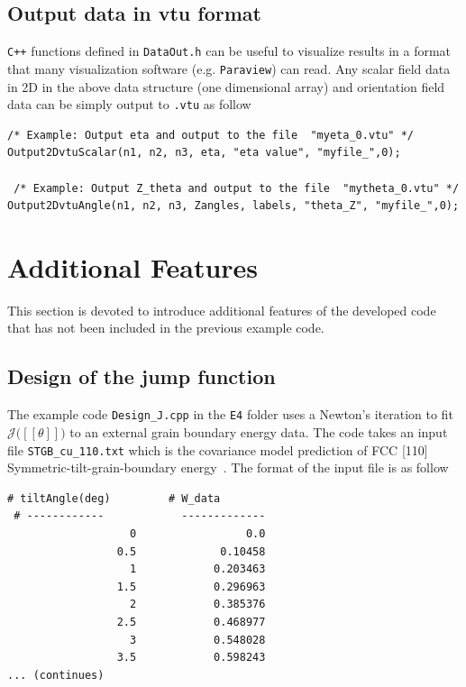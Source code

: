 \documentclass[11pt]{article}
\begin{document}
\subsection{Output data in vtu format}

\texttt{C++} functions defined in \texttt{DataOut.h} can be useful 
to visualize results in a format that many visualization software (e.g. \texttt{Paraview}) 
can read. Any scalar field data in 2D in the above data structure (one dimensional array)
and orientation field data can be simply output to \texttt{.vtu} as follow 

\begin{tcolorbox}
\begin{lstlisting}[basicstyle=\footnotesize]
  /* Example: Output eta and output to the file  "myeta_0.vtu" */
Output2DvtuScalar(n1, n2, n3, eta, "eta value", "myfile_",0);

 /* Example: Output Z_theta and output to the file  "mytheta_0.vtu" */
Output2DvtuAngle(n1, n2, n3, Zangles, labels, "theta_Z", "myfile_",0); 
\end{lstlisting}
\end{tcolorbox}


\section{Additional Features}

This section is devoted to introduce 
additional features of the developed code
that has not been included in the previous example code. 

\subsection{Design of the jump function}

The example code \texttt{Design\_J.cpp} in the \texttt{E4} folder 
uses a Newton's iteration 
to fit $\mathcal{J}\big( [\![ \theta]\!]\big)$ to an external grain boundary energy data. 
The code takes an input file \texttt{STGB\_cu\_110.txt} which is 
the covariance model prediction of FCC [110] Symmetric-tilt-grain-boundary energy~\cite{Runnels:2016_1,Runnels:2016_2}. 
The format of the input file is as follow\\

\begin{tcolorbox}[colback=white]
\begin{lstlisting}[basicstyle=\footnotesize]
 # tiltAngle(deg)         # W_data
 # ------------            -------------  
                   0        	     0.0
                 0.5             0.10458
                   1            0.203463
                 1.5            0.296963
                   2            0.385376
                 2.5            0.468977
                   3            0.548028
                 3.5            0.598243
... (continues)
\end{lstlisting}
\end{tcolorbox}       
\end{document}
